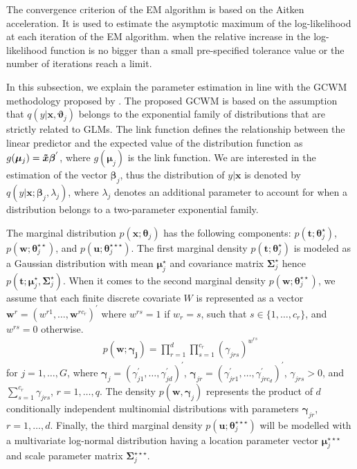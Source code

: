 \documentclass[11pt,letterpaper]{article}
\numberwithin{equation}{section}
\numberwithin{equation}{section}
\numberwithin{equation}{section}
\begin{document}
The convergence criterion of the EM algorithm is based on the Aitken acceleration. It is used to estimate the asymptotic maximum of the log-likelihood at each iteration of the EM algorithm.  when the relative increase in the log-likelihood function is no bigger than a small pre-specified tolerance value or the number of iterations reach a limit. %

In this subsection, we explain the parameter estimation in line with the GCWM methodology proposed by \cite{Ingrassia+Punzo+Vittadini+Minotti:2015}. The proposed GCWM  is based on the assumption that $q(y|\bm{x},\bm{\vartheta}_j)$ belongs to the exponential family of distributions that are strictly related to GLMs. The link function defines the relationship between the linear predictor and the expected value of the distribution function as $g(\bm{\mu}_j)= \bm{\tilde{x}} \bm{\beta}^{'}$, where $g(\bm{\mu}_j)$ is the link function. We are interested in the estimation of the vector $\bm {\beta}_j$, thus the distribution of $y|\bm{x}$ is denoted by $q(y|\bm{x}; \bm{\beta}_j, \lambda_j)$, where $\lambda_j$ denotes an additional parameter to account for when a distribution belongs to a two-parameter exponential family.

The marginal distribution $p(\bm{x}; \bm \theta_j)$ has the following components: $p(\bm{t}; \bm \theta_j^{\star})$, $p(\bm{w}; \bm \theta_j^{\star\star})$, and $p(\bm{u};\bm \theta_{j}^{\star\star\star})$. The first marginal density $p(\bm{t}; \bm \theta_j^{\star})$ is modeled as a  Gaussian distribution with mean $\bm {\mu}_j^{\star}$ and covariance matrix $\bm{\Sigma}_j^{\star}$ hence $p(\bm t; \bm {\mu}_j^{\star}, \bm{\Sigma}_j^{\star})$. When it comes to the second marginal density $p(\bm{w};\bm{\theta}_{j}^{\star\star})$, we assume that each finite discrete covariate $W$ is represented as a vector $\bm{w}^r=(w^{r1},\ldots,\bm{w}^{rc_r})^{'}$ where $w^{rs}=1$ if $w_r = s$, such that $s\in\{1, \ldots, c_r\}$, %
and $w^{rs}=0$ otherwise.
\begin{align}
p(\bm {w}; \bm {\gamma_j})=\prod_{r=1}^{d}\prod_{s=1}^{c_r}(\gamma_{jrs} )^{w^{rs}}
\label{eq31}
\end{align}
for $j=1, \ldots, G$, where $\bm {\gamma}_j=(\gamma_{j1}^{'}, \ldots, \gamma_{jd}^{'})^{'}$, $\bm \gamma_{jr}=(\gamma_{jr1}^{'}, \ldots, \gamma_{jrc_d}^{'})^{'}$, $\gamma_{jrs} > 0$, and  $\sum_{s=1}^{c_r}\gamma_{jrs}$, $r=1,\ldots,q$. The density $p(\bm {w}, \bm{\gamma}_j)$ represents the product of $d$ conditionally independent multinomial distributions with parameters $\bm{\gamma}_{jr}$, $r=1,\ldots, d$. Finally, the third marginal density $p(\bm{u};\bm{\theta}_{j}^{\star\star\star})$ will be modelled with a multivariate log-normal distribution having a location parameter vector $ \bm{\mu}_j^{\star\star\star}$ and scale parameter matrix $\bm{\Sigma}_j^{\star\star\star} $.
\end{document}
